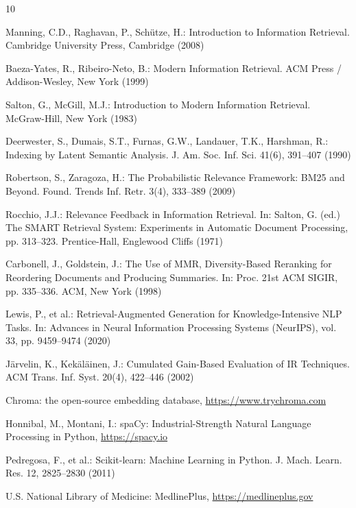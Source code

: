 \documentclass[runningheads,a4paper,14pts]{llncs}
\begin{document}
	\begin{thebibliography}{10}
		
		 Manning, C.D., Raghavan, P., Schütze, H.: Introduction to
		Information Retrieval. Cambridge University Press, Cambridge (2008)
		
		 Baeza-Yates, R., Ribeiro-Neto, B.: Modern Information
		Retrieval. ACM Press / Addison-Wesley, New York (1999)
		
		 Salton, G., McGill, M.J.: Introduction to Modern Information
		Retrieval. McGraw-Hill, New York (1983)
		
		 Deerwester, S., Dumais, S.T., Furnas, G.W., Landauer,
		T.K., Harshman, R.: Indexing by Latent Semantic Analysis. J. Am. Soc. Inf. Sci.
		41(6), 391--407 (1990)
		
		 Robertson, S., Zaragoza, H.: The Probabilistic Relevance
		Framework: BM25 and Beyond. Found. Trends Inf. Retr. 3(4), 333--389 (2009)
		
		 Rocchio, J.J.: Relevance Feedback in Information Retrieval.
		In: Salton, G. (ed.) The SMART Retrieval System: Experiments in Automatic
		Document Processing, pp. 313--323. Prentice-Hall, Englewood Cliffs (1971)
		
		 Carbonell, J., Goldstein, J.: The Use of MMR,
		Diversity-Based Reranking for Reordering Documents and Producing Summaries. In:
		Proc. 21st ACM SIGIR, pp. 335--336. ACM, New York (1998)
		
		 Lewis, P., et al.: Retrieval-Augmented Generation for
		Knowledge-Intensive NLP Tasks. In: Advances in Neural Information Processing
		Systems (NeurIPS), vol. 33, pp. 9459--9474 (2020)
		
		 Järvelin, K., Kekäläinen, J.: Cumulated Gain-Based
		Evaluation of IR Techniques. ACM Trans. Inf. Syst. 20(4), 422--446 (2002)
		
		 Chroma: the open-source embedding database,
		\url{https://www.trychroma.com}
		
		 Honnibal, M., Montani, I.: spaCy: Industrial-Strength Natural
		Language Processing in Python, \url{https://spacy.io}
		
		 Pedregosa, F., et al.: Scikit-learn: Machine Learning in
		Python. J. Mach. Learn. Res. 12, 2825--2830 (2011)
		
		 U.S. National Library of Medicine: MedlinePlus,
		\url{https://medlineplus.gov}
		
	\end{thebibliography}
	
	
\end{document}
